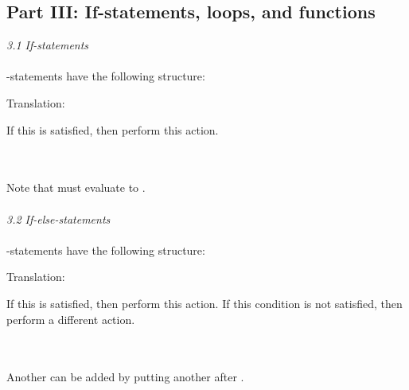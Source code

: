 \label{rhelppartthree}

\subsection{Part III: If-statements, loops, and functions}

\textit{3.1 If-statements} \\
\\
-statements have the following structure: \\


\begin{minipage}[t]{0.2\textwidth}
Translation:
\end{minipage}
\begin{minipage}[t]{0.8\textwidth}
If this  is satisfied, then perform this action.
\end{minipage} \\
\\
Note that  must evaluate to . \\
\\ 
\textit{3.2 If-else-statements} \\
\\
-statements have the following structure: \\


\begin{minipage}[t]{0.2\textwidth}
Translation:
\end{minipage}
\begin{minipage}[t]{0.8\textwidth}
If this  is satisfied, then perform this action. If this condition is not satisfied, then perform a different action.
\end{minipage} \\
\\
Another  can be added by putting another  after . \\

